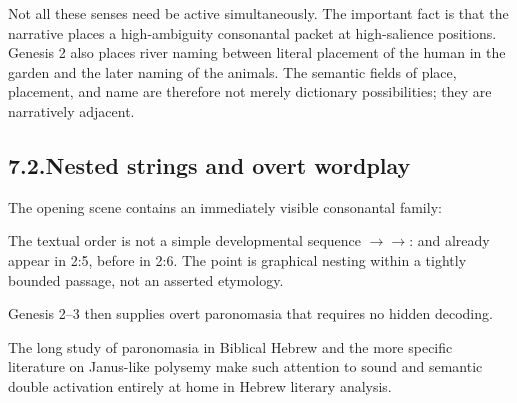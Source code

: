 Not all these senses need be active simultaneously.  The important fact is that the narrative places a high-ambiguity consonantal packet at high-salience positions.  Genesis 2 also places river naming between literal placement of the human in the garden and the later naming of the animals.  The semantic fields of place, placement, and name are therefore not merely dictionary possibilities; they are narratively adjacent.

\subsection*{7.2.\quad Nested strings and overt wordplay}

The opening scene contains an immediately visible consonantal family:


The textual order is not a simple developmental sequence \(\rightarrow\)\(\rightarrow\):  and  already appear in 2:5, before  in 2:6.  The point is graphical nesting within a tightly bounded passage, not an asserted etymology.

Genesis 2--3 then supplies overt paronomasia that requires no hidden decoding.


The long study of paronomasia in Biblical Hebrew and the more specific literature on Janus-like polysemy make such attention to sound and semantic double activation entirely at home in Hebrew literary analysis.\cite{Casanowicz1894,Watson1984,Noegel1996}


